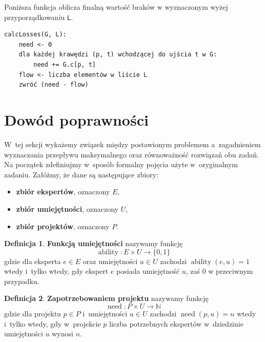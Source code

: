\documentclass[12pt,a4paper]{article}
\theoremstyle{definition}
\newtheorem{defn}{Definicja}
\DeclareMathOperator{\ability}{ability}
\DeclareMathOperator{\need}{need}
\begin{document}
\vspace{0.5em}
\noindent
Poniższa funkcja oblicza finalną wartość braków w wyznaczonym wyżej przyporządkowaniu \texttt{L}.\\

\begin{tcolorbox}[title=Wzynaczanie braków]
\begin{verbatim}
calcLosses(G, L):
    need <- 0
    dla każdej krawędzi (p, t) wchodzącej do ujścia t w G:
        need += G.c[p, t]
    flow <- liczba elementów w liście L
    zwróć (need - flow)
\end{verbatim}
\end{tcolorbox}

\section{Dowód poprawności}
\label{sec:correctnessproof}

W~tej sekcji wykażemy związek między postawionym problemem a~zagadnieniem
wyznaczania przepływu maksymalnego oraz równoważność rozwiązań obu zadań.\\

\noindent
Na początek zdefiniujmy w~sposób formalny pojęcia użyte w~oryginalnym zadaniu.
Załóżmy, że dane są następujące zbiory:

\begin{itemize}
	\item \textbf{zbiór ekspertów}, oznaczony $E$,
	\item \textbf{zbiór umiejętności}, oznaczony $U$,
	\item \textbf{zbiór projektów}, oznaczony $P$.
\end{itemize}

\begin{defn}
\textbf{Funkcją umiejętności} nazywamy funkcję
$$ \ability : E \times U \to \{ 0,1 \} $$
gdzie dla eksperta $e \in E$ oraz umiejętności $u \in U$ zachodzi
$\ability(e, u) = 1$ wtedy i~tylko wtedy, gdy ekspert $e$ posiada umiejętność
$u$, zaś 0 w przeciwnym przypadku.
\end{defn}

\begin{defn}
\textbf{Zapotrzebowaniem projektu} nazywamy funkcję
$$ \need : P \times U \to \mathbb{N} $$
gdzie dla projektu $p \in P$ i~umiejętności $u \in U$ zachodzi $\need(p, u) = n$
wtedy i~tylko wtedy, gdy w~projekcie $p$ liczba potrzebnych ekspertów
w~dziedzinie umiejętności $u$ wynosi $n$.
\end{defn}
\end{document}
